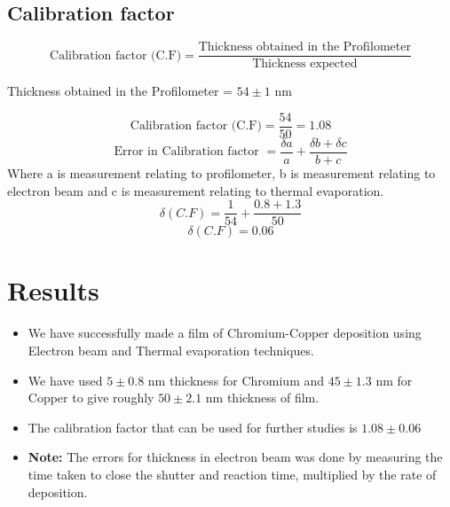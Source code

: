 \documentclass[]{report}[12 pt]
\begin{document}
\subsection*{Calibration factor}

\[ \text{Calibration factor (C.F)}= \frac{\text{Thickness obtained in the Profilometer}}{\text{Thickness expected}}\]

Thickness obtained in the Profilometer = $54 \pm 1 $ nm

\[ \text{Calibration factor (C.F)}= \frac{54}{50} = 1.08\]
\[\text{Error in Calibration factor }= \frac{\delta a}{a}+\frac{\delta b + \delta c}{b+c}\]
Where a is measurement relating to profilometer, b is measurement relating to electron beam and c is measurement relating to thermal evaporation.
\[\delta (C.F) =  \frac{1}{54}+\frac{0.8 + 1.3}{50}\]
\[\delta (C.F) =  0.06\]

\section*{Results}
\begin{itemize}
	\item We have successfully made a film of Chromium-Copper deposition using Electron beam and Thermal evaporation techniques.
	\item We have used $5\pm 0.8$ nm thickness for Chromium and $45 \pm 1.3$ nm for Copper to give roughly $50 \pm 2.1$ nm thickness of film. 
	\item The calibration factor that can be used for further studies is $1.08 \pm 0.06$ 
	\item \textbf{Note: }The errors for thickness in electron beam was done by measuring the time taken to close the shutter and reaction time, multiplied by the rate of deposition.
\end{itemize}
\end{document}
